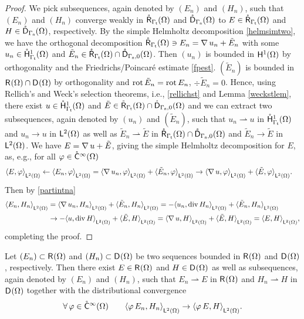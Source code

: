 \documentclass[a4paper]{amsart}
\newcommand{\wto}{\rightharpoonup}
\begin{document}
\begin{proof}
We pick subsequences, again denoted by $(E_{n})$ and $(H_{n})$, 
such that $(E_{n})$ and $(H_{n})$ converge weakly in $\rcgatom$ and $\dcganom$ to
$E\in\rcgatom$ and $H\in\dcganom$, respectively. By the simple Helmholtz decomposition \eqref{helmsimtwo},
we have the orthogonal decomposition $\rcgatom\ni E_{n}=\na u_{n}+\tilde{E}_{n}$ with some $u_{n}\in\hocgatom$
and $\tilde{E}_{n}\in\rcgatom\cap\dcganzom$. Then $(u_{n})$ is bounded in $\hoom$ by orthogonality 
and the Friedrichs/Poincar\'e estimate \eqref{fpest}.
$(\tilde{E}_{n})$ is bounded in $\rom\cap\dom$ by orthogonality and $\rot\tilde{E}_{n}=\rot E_{n}$, $\div\tilde{E}_{n}=0$.
Hence, using Rellich's and Weck's selection theorems, i.e., \eqref{rellichst} and Lemma \ref{weckstlem},
there exist $u\in\hocgatom$ and $\tilde{E}\in\rcgatom\cap\dcganzom$
and we can extract two subsequences, again denoted by $(u_{n})$ and $(\tilde{E}_{n})$, 
such that $u_{n}\rightharpoonup u$ in $\hocgatom$ and $u_{n}\to u$ in $\ltom$
as well as $\tilde{E}_{n}\rightharpoonup\tilde{E}$ in $\rcgatom\cap\dcganzom$ 
and $\tilde{E}_{n}\to\tilde{E}$ in $\ltom$. 
We have $E=\na u+\tilde{E}$, giving the simple Helmholtz decomposition for $E$, 
as, e.g., for all $\varphi\in\cicom$
\begin{align*}
\scpltom{E}{\varphi}
&\ot\scpltom{E_{n}}{\varphi}
=\scpltom{\na u_{n}}{\varphi}
+\scpltom{\tilde{E}_{n}}{\varphi}
\to\scpltom{\na u}{\varphi}
+\scpltom{\tilde{E}}{\varphi}.
\end{align*}
Then by \eqref{partintna}
\begin{align*}
\scpltom{E_{n}}{H_{n}}
&=\scpltom{\na u_{n}}{H_{n}}
+\scpltom{\tilde{E}_{n}}{H_{n}}
=-\scpltom{u_{n}}{\div H_{n}}
+\scpltom{\tilde{E}_{n}}{H_{n}}\\
&\to-\scpltom{u}{\div H}
+\scpltom{\tilde{E}}{H}
=\scpltom{\na u}{H}
+\scpltom{\tilde{E}}{H}
=\scpltom{E}{H},
\end{align*}
completing the proof.
\end{proof}

\begin{cor}
Let $(E_{n})\subset\rom$ and $(H_{n})\subset\dom$ be two sequences bounded in $\rom$ and $\dom$, respectively.
Then there exist $E\in\rom$ and $H\in\dom$ as well as subsequences, again denoted by $(E_{n})$ and $(H_{n})$, 
such that $E_{n}\wto E$ in $\rom$ and $H_{n}\wto H$ in $\dom$ together with
the distributional convergence
$$\forall\,\varphi\in\cicom\qquad\scpltom{\varphi\,E_{n}}{H_{n}}\to\scpltom{\varphi\,E}{H}.$$
\end{cor}
\end{document}
